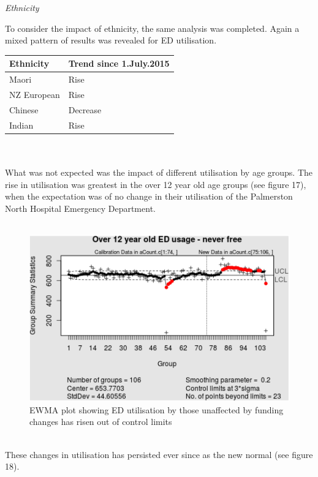 \documentclass[11pt,a4paper]{article}
\begin{document}
\emph{Ethnicity}

To consider the impact of ethnicity, the same analysis was completed. Again a mixed pattern of results was revealed for ED utilisation.\\

\begin{tabular}{|l|l|}
\hline
	Ethnicity & Trend since 1.July.2015\\
\hline
	Maori & Rise\\
\hline
	NZ European & Rise\\
\hline
	Chinese & Decrease\\
\hline
	Indian & Rise\\
\hline
\end{tabular}
\\
\\
What was not expected was the impact of different utilisation by age groups. The rise in utilisation was greatest in the over 12 year old age groups (see figure 17), when the expectation was of no change in their utilisation of the Palmerston North Hospital Emergency Department.\\
\\
\begin{figure}[htp]
\centering
\includegraphics[scale=0.50]{Over12.png}
\caption{EWMA plot showing ED utilisation by those unaffected by funding changes has risen out of control limits}
\label{Rise in ED utilisation by over 12 years old}
\end{figure}
\\

These changes in utilisation has persisted ever since as the new normal (see figure 18).\\
\\
\end{document}

